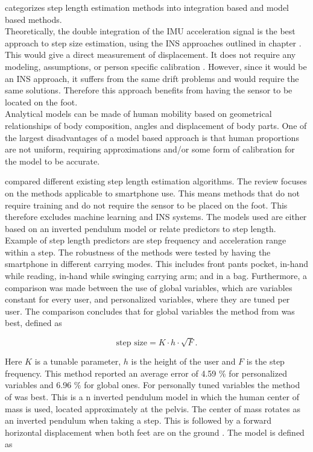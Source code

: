 \citet{Diez2018} categorizes step length estimation methods into integration based and model based methods. \\
Theoretically, the double integration of the IMU acceleration signal is the best approach to step size estimation, using the INS approaches outlined in chapter . This would give a direct measurement of displacement. It does not require any modeling, assumptions, or person specific calibration \cite{Diez2018}. However, since it would be an INS approach, it suffers from the same drift problems and would require the same solutions. Therefore this approach benefits from having the sensor to be located on the foot. \\
Analytical models can be made of human mobility based on geometrical relationships of body composition, angles and displacement of body parts. One of the largest disadvantages of a model based approach is that human proportions are not uniform, requiring approximations and/or some form of calibration for the model to be accurate.


\citet{Vezocnik2019} compared different existing step length estimation algorithms. The review focuses on the methods applicable to smartphone use. This means methods that do not require training and do not require the sensor to be placed on the foot. This therefore excludes machine learning and INS systems. The models used are either based on an inverted pendulum model or relate predictors to step length. Example of step length predictors are step frequency and acceleration range within a step. The robustness of the methods were tested by having the smartphone in different carrying modes. This includes front pants pocket, in-hand while reading, in-hand while  swinging carrying arm; and in a bag. Furthermore, a comparison was made between the use of global variables, which are variables constant for every user, and personalized variables, where they are tuned per user. The comparison concludes that for global variables the method from \cite{Tian2016} was best, defined as

\begin{equation}
	\label{eq:Tian2016_sle}
	\text{step size} = K \cdot h \cdot \sqrt{F}.
\end{equation}

Here $K$ is a tunable parameter, $h$ is the height of the user and $F$ is the step frequency. This method reported an average error of  4.59 \% for personalized variables and 6.96 \% for global ones. For personally tuned variables the method of \cite{Weinberg2002} was best. This is a n inverted pendulum model in which the human center of mass is used, located approximately at the pelvis. The center of mass rotates as an inverted pendulum when taking a step. This is followed by a forward horizontal displacement when both feet are on the ground \cite{Diez2018}. The model is defined as 

